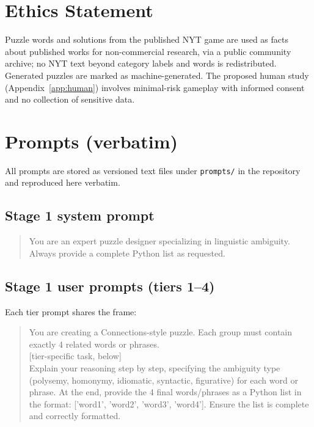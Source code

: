 \documentclass[11pt]{article}
\begin{document}
\section*{Ethics Statement}
Puzzle words and solutions from the published NYT game are used as facts about published works for non-commercial research, via a public community archive; no NYT text beyond category labels and words is redistributed. Generated puzzles are marked as machine-generated. The proposed human study (Appendix~\ref{app:human}) involves minimal-risk gameplay with informed consent and no collection of sensitive data.



\appendix

\section{Prompts (verbatim)}
\label{app:prompts}

All prompts are stored as versioned text files under \texttt{prompts/} in the repository and reproduced here verbatim.

\subsection{Stage 1 system prompt}
\begin{quote}\small\ttfamily
You are an expert puzzle designer specializing in linguistic ambiguity. Always provide a complete Python list as requested.
\end{quote}

\subsection{Stage 1 user prompts (tiers 1--4)}
Each tier prompt shares the frame:
\begin{quote}\small\ttfamily
You are creating a Connections-style puzzle. Each group must contain exactly 4 related words or phrases.\\[2pt]
\textrm{[tier-specific task, below]}\\[2pt]
Explain your reasoning step by step, specifying the ambiguity type (polysemy, homonymy, idiomatic, syntactic, figurative) for each word or phrase. At the end, provide the 4 final words/phrases as a Python list in the format: ['word1', 'word2', 'word3', 'word4']. Ensure the list is complete and correctly formatted.
\end{quote}
\end{document}
